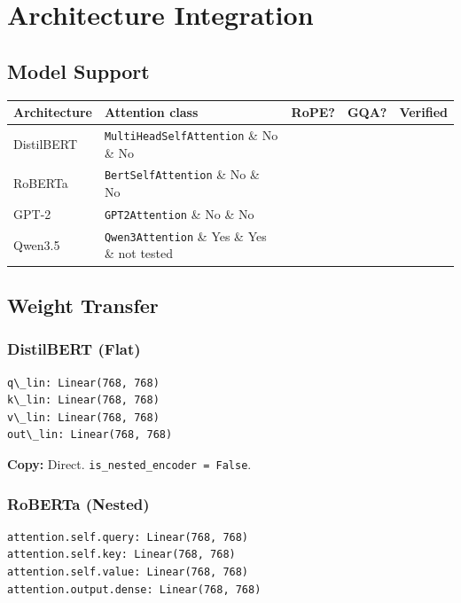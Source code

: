 
\section{Architecture Integration}

\subsection{Model Support}

\begin{table}[H]
\centering
\small
\begin{tabular}{lllll}
\toprule
\textbf{Architecture} & \textbf{Attention class} & \textbf{RoPE?} & \textbf{GQA?} & \textbf{Verified} \\
\midrule
DistilBERT & \texttt{MultiHeadSelfAttention} \& No \& No &  \\
RoBERTa & \texttt{BertSelfAttention} \& No \& No &  \\
GPT-2 & \texttt{GPT2Attention} \& No \& No &  \\
Qwen3.5 & \texttt{Qwen3Attention} \& Yes \& Yes \& not tested \\
\bottomrule
\end{tabular}
\end{table}

\subsection{Weight Transfer}

\subsubsection{DistilBERT (Flat)}

\begin{lstlisting}
q\_lin: Linear(768, 768)
k\_lin: Linear(768, 768)
v\_lin: Linear(768, 768)
out\_lin: Linear(768, 768)
\end{lstlisting}

\textbf{Copy:} Direct. \texttt{is\_nested\_encoder = False}.

\subsubsection{RoBERTa (Nested)}

\begin{lstlisting}
attention.self.query: Linear(768, 768)
attention.self.key: Linear(768, 768)
attention.self.value: Linear(768, 768)
attention.output.dense: Linear(768, 768)
\end{lstlisting}

